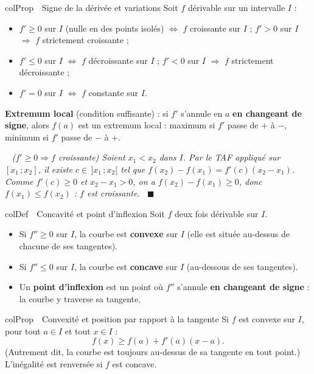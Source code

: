 \documentclass[11pt,a4paper]{article}
\newenvironment{definition}[1][Définition]
  {\begin{fiche}{colDef}{\ding{110}~~#1}}{\end{fiche}}
\newenvironment{propriete}[1][Propriété]
  {\begin{fiche}{colProp}{\ding{72}~~#1}}{\end{fiche}}
\newenvironment{demo}
  {\par\smallskip\noindent{\sffamily\bfseries\color{qtealdark}Démonstration.}\ \itshape}
  {\ \normalfont\hfill$\blacksquare$\par\medskip}
\begin{document}
\begin{propriete}[Signe de la dérivée et variations]
Soit $f$ dérivable sur un intervalle $I$ :
\begin{itemize}[leftmargin=6mm, itemsep=0.5mm]
  \item $f' \geq 0$ sur $I$ (nulle en des points isolés) $\iff$ $f$ croissante sur $I$ ; $f' > 0$ sur $I$ $\Rightarrow$ $f$ strictement croissante ;
  \item $f' \leq 0$ sur $I$ $\iff$ $f$ décroissante sur $I$ ; $f' < 0$ sur $I$ $\Rightarrow$ $f$ strictement décroissante ;
  \item $f' = 0$ sur $I$ $\iff$ $f$ constante sur $I$.
\end{itemize}
\textbf{Extremum local} (condition suffisante) : si $f'$ s'annule en $a$ \textbf{en changeant de signe}, alors $f(a)$ est un extremum local : maximum si $f'$ passe de $+$ à $-$, minimum si $f'$ passe de $-$ à $+$.
\end{propriete}

\begin{demo}
($f' \geq 0 \Rightarrow f$ croissante) Soient $x_1 < x_2$ dans $I$. Par le TAF appliqué sur $[x_1\,;x_2]$, il existe $c \in\, ]x_1\,;x_2[$ tel que $f(x_2) - f(x_1) = f'(c)(x_2 - x_1)$. Comme $f'(c) \geq 0$ et $x_2 - x_1 > 0$, on a $f(x_2) - f(x_1) \geq 0$, donc $f(x_1) \leq f(x_2)$ : $f$ est croissante.
\end{demo}

\begin{definition}[Concavité et point d'inflexion]
Soit $f$ deux fois dérivable sur $I$.
\begin{itemize}[leftmargin=6mm, itemsep=0.5mm]
  \item Si $f'' \geq 0$ sur $I$, la courbe est \textbf{convexe} sur $I$ (elle est située au-dessus de chacune de ses tangentes).
  \item Si $f'' \leq 0$ sur $I$, la courbe est \textbf{concave} sur $I$ (au-dessous de ses tangentes).
  \item Un \textbf{point d'inflexion} est un point où $f''$ s'annule \textbf{en changeant de signe} : la courbe y traverse sa tangente.
\end{itemize}
\end{definition}

\begin{propriete}[Convexité et position par rapport à la tangente]
Si $f$ est convexe sur $I$, pour tout $a \in I$ et tout $x \in I$ :
\[
  f(x) \geq f(a) + f'(a)(x - a).
\]
(Autrement dit, la courbe est toujours au-dessus de sa tangente en tout point.) L'inégalité est renversée si $f$ est concave.
\end{propriete}
\end{document}
